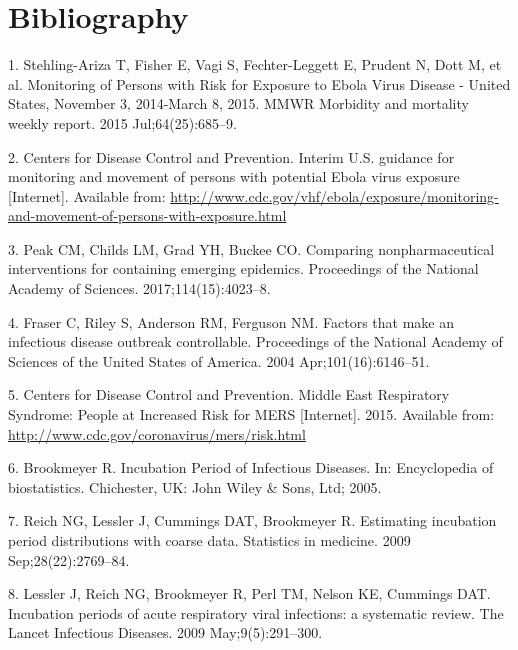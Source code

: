 \documentclass[]{article}
\begin{document}
\section*{Bibliography}\label{bibliography}

\hypertarget{refs}{}
\hypertarget{ref-StehlingAriza:2015vd}{}
1. Stehling-Ariza T, Fisher E, Vagi S, Fechter-Leggett E, Prudent N,
Dott M, et al. Monitoring of Persons with Risk for Exposure to Ebola
Virus Disease - United States, November 3, 2014-March 8, 2015. MMWR
Morbidity and mortality weekly report. 2015 Jul;64(25):685--9.

\hypertarget{ref-CentersforDiseaseControlandPrevention:lyxYF_Hp}{}
2. Centers for Disease Control and Prevention. Interim U.S. guidance for
monitoring and movement of persons with potential Ebola virus exposure
{[}Internet{]}. Available from:
\url{http://www.cdc.gov/vhf/ebola/exposure/monitoring-and-movement-of-persons-with-exposure.html}

\hypertarget{ref-peak2017comparing}{}
3. Peak CM, Childs LM, Grad YH, Buckee CO. Comparing nonpharmaceutical
interventions for containing emerging epidemics. Proceedings of the
National Academy of Sciences. 2017;114(15):4023--8.

\hypertarget{ref-Fraser:2004ci}{}
4. Fraser C, Riley S, Anderson RM, Ferguson NM. Factors that make an
infectious disease outbreak controllable. Proceedings of the National
Academy of Sciences of the United States of America. 2004
Apr;101(16):6146--51.

\hypertarget{ref-CentersforDiseaseControlandPrevention:2015tk}{}
5. Centers for Disease Control and Prevention. Middle East Respiratory
Syndrome: People at Increased Risk for MERS {[}Internet{]}. 2015.
Available from: \url{http://www.cdc.gov/coronavirus/mers/risk.html}

\hypertarget{ref-Brookmeyer:2005bc}{}
6. Brookmeyer R. Incubation Period of Infectious Diseases. In:
Encyclopedia of biostatistics. Chichester, UK: John Wiley \& Sons, Ltd;
2005.

\hypertarget{ref-Reich:2009jq}{}
7. Reich NG, Lessler J, Cummings DAT, Brookmeyer R. Estimating
incubation period distributions with coarse data. Statistics in
medicine. 2009 Sep;28(22):2769--84.

\hypertarget{ref-Lessler:2009ub}{}
8. Lessler J, Reich NG, Brookmeyer R, Perl TM, Nelson KE, Cummings DAT.
Incubation periods of acute respiratory viral infections: a systematic
review. The Lancet Infectious Diseases. 2009 May;9(5):291--300.
\end{document}
